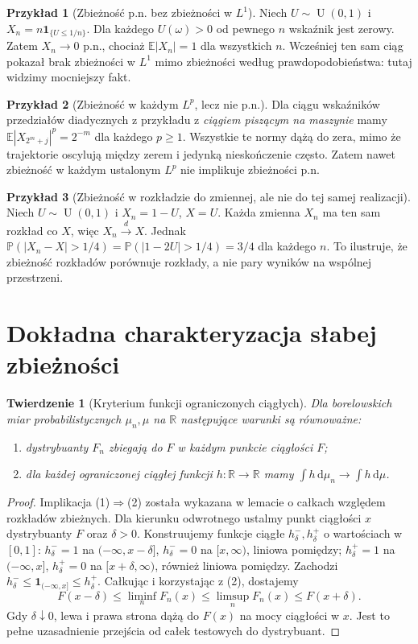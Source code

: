 \documentclass[11pt,a4paper,oneside]{report}
\numberwithin{equation}{chapter}
\theoremstyle{plain}
\newtheorem{twierdzenie}{Twierdzenie}[chapter]
\theoremstyle{definition}
\newtheorem{przyklad}{Przykład}[chapter]
\theoremstyle{remark}
\newcommand{\R}{\mathbb{R}}
\newcommand{\Prob}{\mathbb{P}}
\newcommand{\E}{\mathbb{E}}
\newcommand{\ind}[1]{\mathbf{1}_{#1}}
\newcommand{\dd}{\mathrm{d}}
\newcommand{\Unif}{\operatorname{U}}
\begin{document}
\begin{przyklad}[Zbieżność p.n. bez zbieżności w $L^1$]
Niech $U\sim\Unif(0,1)$ i $X_n=n\ind{\{U\leq1/n\}}$.
Dla każdego $U(\omega)>0$ od pewnego $n$ wskaźnik
jest zerowy. Zatem $X_n\to0$ p.n., chociaż
$\E|X_n|=1$ dla wszystkich $n$. Wcześniej ten sam
ciąg pokazał brak zbieżności w $L^1$ mimo zbieżności
według prawdopodobieństwa: tutaj widzimy mocniejszy fakt.
\end{przyklad}

\begin{przyklad}[Zbieżność w każdym $L^p$, lecz nie p.n.]
Dla ciągu wskaźników przedziałów diadycznych
z przykładu z \emph{ciągiem piszącym na maszynie}
mamy $\E|X_{2^m+j}|^p=2^{-m}$ dla każdego $p\geq1$.
Wszystkie te normy dążą do zera, mimo że trajektorie
oscylują między zerem i jedynką nieskończenie często.
Zatem nawet zbieżność w każdym ustalonym $L^p$
nie implikuje zbieżności p.n.
\end{przyklad}

\begin{przyklad}[Zbieżność w rozkładzie do zmiennej, ale nie do tej samej realizacji]
Niech $U\sim\Unif(0,1)$ i $X_n=1-U$, $X=U$.
Każda zmienna $X_n$ ma ten sam rozkład co $X$,
więc $X_n\xrightarrow{d}X$. Jednak
$\Prob(|X_n-X|>1/4)=\Prob(|1-2U|>1/4)=3/4$
dla każdego $n$. To ilustruje, że zbieżność
rozkładów porównuje rozkłady, a nie pary wyników
na wspólnej przestrzeni.
\end{przyklad}

\section{Dokładna charakteryzacja słabej zbieżności}

\begin{twierdzenie}[Kryterium funkcji ograniczonych ciągłych]
Dla borelowskich miar probabilistycznych $\mu_n,\mu$
na $\R$ następujące warunki są równoważne:
\begin{enumerate}
\item dystrybuanty $F_n$ zbiegają do $F$ w każdym
punkcie ciągłości $F$;
\item dla każdej ograniczonej ciągłej funkcji
$h:\R\to\R$ mamy $\int h\,\dd\mu_n\to\int h\,\dd\mu$.
\end{enumerate}
\end{twierdzenie}
\begin{proof}
Implikacja (1)$\Rightarrow$(2) została wykazana w lemacie
o całkach względem rozkładów zbieżnych. Dla kierunku
odwrotnego ustalmy punkt ciągłości $x$ dystrybuanty $F$
oraz $\delta>0$. Konstruujemy funkcje ciągłe
$h^-_\delta,h^+_\delta$ o wartościach w $[0,1]$:
$h^-_\delta=1$ na $(-\infty,x-\delta]$,
$h^-_\delta=0$ na $[x,\infty)$, liniowa pomiędzy;
$h^+_\delta=1$ na $(-\infty,x]$,
$h^+_\delta=0$ na $[x+\delta,\infty)$, również
liniowa pomiędzy. Zachodzi
$h^-_\delta\leq\ind{(-\infty,x]}\leq h^+_\delta$.
Całkując i korzystając z (2), dostajemy
\[
F(x-\delta)\leq\liminf_nF_n(x)
\leq\limsup_nF_n(x)\leq F(x+\delta).
\]
Gdy $\delta\downarrow0$, lewa i prawa strona
dążą do $F(x)$ na mocy ciągłości w $x$.
Jest to pełne uzasadnienie przejścia od całek
testowych do dystrybuant.
\end{proof}
\end{document}
